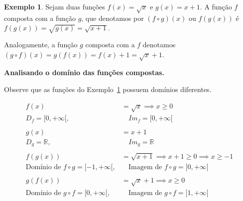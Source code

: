 \documentclass[12pt,openright,twoside,a4paper]{article}
\theoremstyle{definition}
\newtheorem{example}{Exemplo}[section]
\begin{document}
	\begin{example}\label{ex:funcoes_compostas} Sejam duas funções $f(x) = \sqrt{x}$ e $g(x) = x + 1$. A função $f$ composta com a função $g$, que denotamos por $(f \circ g)(x)$ ou $f(g(x))$ é $f(g(x)) = \sqrt{g(x)} = \sqrt{x+1}$.
	
	Analogamente, a função $g$ composta com a $f$ denotamos $(g \circ f)(x) = g(f(x)) = f(x) + 1 = \sqrt{x} + 1$.
	\end{example}	
	
	\textbf{Analisando o domínio das funções compostas.}
	
	Observe que as funções do Exemplo~\ref{ex:funcoes_compostas} possuem domínios diferentes.
	
	\begin{align*}
		f(x) &= \sqrt{x} \implies x \geq 0\\
		D_f = [0, + \infty[,& \quad Im_f = [0, + \infty[\\
		\\
		g(x) &= x + 1\\
		D_g = \mathbb{R},& \quad Im_g = \mathbb{R}\\
		\\
		f(g(x)) &= \sqrt{x + 1} \implies x + 1 \geq 0 \implies x \geq -1\\
		\text{Domínio de } f \circ g = [-1, + \infty[,& \quad \text{Imagem de } f \circ g = [0, + \infty[\\
		\\
		g(f(x)) &= \sqrt{x} + 1 \implies x \geq 0\\
		\text{Domínio de } g \circ f = [0, + \infty[,& \quad \text{Imagem de } g \circ f = [1, + \infty[
	\end{align*}
	
\end{document}
